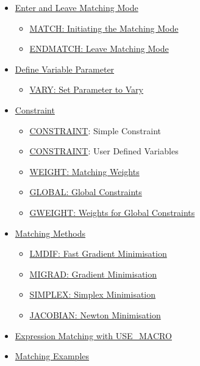 \begin{itemize}
	\item \href{match_main.html}{Enter and Leave Matching Mode}
\begin{itemize}
	\item \href{match_main.html#match}{MATCH: Initiating the Matching Mode}
	\item \href{match_main.html#endmatch}{ENDMATCH: Leave Matching Mode}
\end{itemize}
	\item \href{match_vary.html}{Define Variable Parameter}
\begin{itemize}
	\item \href{match_vary.html#vary}{VARY: Set Parameter to Vary}
\end{itemize}
	\item \href{match_con.html}{Constraint}
\begin{itemize}
	\item \href{match_con.html#constraint}{CONSTRAINT}: Simple Constraint 
	\item \href{match_con.html#user-var}{CONSTRAINT}: User Defined Variables 
	\item \href{match_con.html#weight}{WEIGHT: Matching Weights}
	\item \href{match_con.html#global}{GLOBAL: Global Constraints}
	\item \href{match_con.html#global}{GWEIGHT: Weights for Global Constraints}
\end{itemize}
	\item \href{match_xeq.html}{Matching Methods}
\begin{itemize}
	\item \href{match_xeq.html#lmdif}{LMDIF: Fast Gradient Minimisation}
	\item \href{match_xeq.html#migrad}{MIGRAD: Gradient Minimisation}
	\item \href{match_xeq.html#simplex}{SIMPLEX: Simplex Minimisation}
	\item \href{match_xeq.html#jacobian}{JACOBIAN: Newton Minimisation}
\end{itemize}
	\item \href{match_um.html}{Expression Matching with USE\_MACRO}
\item \href{match_xmpl.html}{Matching Examples}
\end{itemize}











